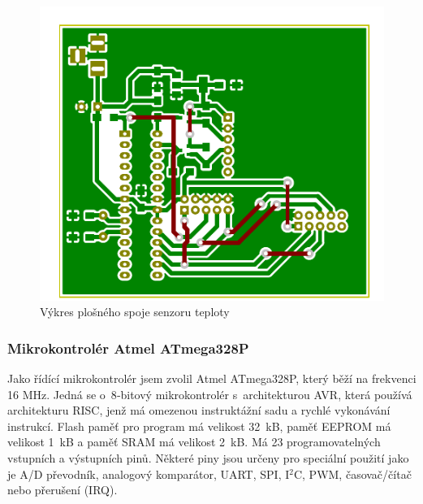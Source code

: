 \documentclass[12pt,a4paper]{article}
\begin{document}
\begin{figure}[H]
\centering
\label{fig:board/sensor}
\includegraphics{img/kicad/sensor-board.pdf}
\caption{Výkres plošného spoje senzoru teploty}
\end{figure}

\newpage

\subsubsection{Mikrokontrolér Atmel ATmega328P}

Jako řídící mikrokontrolér jsem zvolil Atmel ATmega328P, který běží na frekvenci 16 MHz. Jedná se o~8‑bitový mikrokontrolér s~architekturou AVR, která používá architekturu RISC, jenž má omezenou instruktážní sadu a rychlé vykonávání instrukcí. Flash paměť pro program má velikost 32~kB, paměť EEPROM má velikost 1~kB a paměť SRAM má velikost 2~kB. Má 23 programovatelných vstupních a výstupních pinů. Některé piny jsou určeny pro speciální použití jako je A/D převodník, analogový komparátor, UART, SPI, I$^{2}$C, PWM, časovač/čítač nebo přerušení (IRQ).
\end{document}
